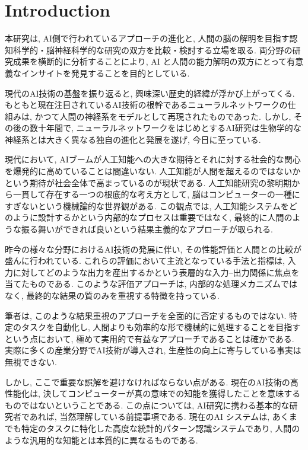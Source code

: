 \section{Introduction}

本研究は, AI側で行われているアプローチの進化と, 人間の脳の解明を目指す認知科学的・脳神経科学的な研究の双方を比較・検討する立場を取る.
両分野の研究成果を横断的に分析することにより, AI と人間の能力解明の双方にとって有意義なインサイトを発見することを目的としている.

現代のAI技術の基盤を振り返ると, 興味深い歴史的経緯が浮かび上がってくる.
もともと現在注目されているAI技術の根幹であるニューラルネットワークの仕組みは, かつて人間の神経系をモデルとして再現されたものであった.
しかし, その後の数十年間で, ニューラルネットワークをはじめとするAI研究は生物学的な神経系とは大きく異なる独自の進化と発展を遂げ, 今日に至っている.

現代において, AIブームが人工知能への大きな期待とそれに対する社会的な関心を爆発的に高めていることは間違いない.
人工知能が人間を超えるのではないかという期待が社会全体で高まっているのが現状である.
人工知能研究の黎明期から一貫して存在する一つの根底的な考え方として, 脳はコンピューターの一種にすぎないという機械論的な世界観がある.
この観点では, 人工知能システムをどのように設計するかという内部的なプロセスは重要ではなく, 最終的に人間のような振る舞いができれば良いという結果主義的なアプローチが取られる.

昨今の様々な分野におけるAI技術の発展に伴い, その性能評価と人間との比較が盛んに行われている.
これらの評価において主流となっている手法と指標は, 入力に対してどのような出力を産出するかという表層的な入力--出力関係に焦点を当てたものである.
このような評価アプローチは, 内部的な処理メカニズムではなく, 最終的な結果の質のみを重視する特徴を持っている.

筆者は, このような結果重視のアプローチを全面的に否定するものではない.
特定のタスクを自動化し, 人間よりも効率的な形で機械的に処理することを目指すという点において, 極めて実用的で有益なアプローチであることは確かである.
実際に多くの産業分野でAI技術が導入され, 生産性の向上に寄与している事実は無視できない.

しかし, ここで重要な誤解を避けなければならない点がある.
現在のAI技術の高性能化は, 決してコンピューターが真の意味での知能を獲得したことを意味するものではないということである.
この点については, AI研究に携わる基本的な研究者であれば, 当然理解している前提事項である.
現在のAI システムは, あくまでも特定のタスクに特化した高度な統計的パターン認識システムであり, 人間のような汎用的な知能とは本質的に異なるものである.

